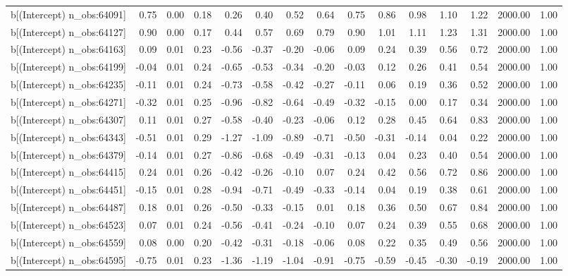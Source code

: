 \begin{table}[ht]
\begin{tabular}{rrrrrrrrrrrrrrr}
  b[(Intercept) n\_obs:64091] & 0.75 & 0.00 & 0.18 & 0.26 & 0.40 & 0.52 & 0.64 & 0.75 & 0.86 & 0.98 & 1.10 & 1.22 & 2000.00 & 1.00 \\ 
  b[(Intercept) n\_obs:64127] & 0.90 & 0.00 & 0.17 & 0.44 & 0.57 & 0.69 & 0.79 & 0.90 & 1.01 & 1.11 & 1.23 & 1.31 & 2000.00 & 1.00 \\ 
  b[(Intercept) n\_obs:64163] & 0.09 & 0.01 & 0.23 & -0.56 & -0.37 & -0.20 & -0.06 & 0.09 & 0.24 & 0.39 & 0.56 & 0.72 & 2000.00 & 1.00 \\ 
  b[(Intercept) n\_obs:64199] & -0.04 & 0.01 & 0.24 & -0.65 & -0.53 & -0.34 & -0.20 & -0.03 & 0.12 & 0.26 & 0.41 & 0.54 & 2000.00 & 1.00 \\ 
  b[(Intercept) n\_obs:64235] & -0.11 & 0.01 & 0.24 & -0.73 & -0.58 & -0.42 & -0.27 & -0.11 & 0.06 & 0.19 & 0.36 & 0.52 & 2000.00 & 1.00 \\ 
  b[(Intercept) n\_obs:64271] & -0.32 & 0.01 & 0.25 & -0.96 & -0.82 & -0.64 & -0.49 & -0.32 & -0.15 & 0.00 & 0.17 & 0.34 & 2000.00 & 1.00 \\ 
  b[(Intercept) n\_obs:64307] & 0.11 & 0.01 & 0.27 & -0.58 & -0.40 & -0.23 & -0.06 & 0.12 & 0.28 & 0.45 & 0.64 & 0.83 & 2000.00 & 1.00 \\ 
  b[(Intercept) n\_obs:64343] & -0.51 & 0.01 & 0.29 & -1.27 & -1.09 & -0.89 & -0.71 & -0.50 & -0.31 & -0.14 & 0.04 & 0.22 & 2000.00 & 1.00 \\ 
  b[(Intercept) n\_obs:64379] & -0.14 & 0.01 & 0.27 & -0.86 & -0.68 & -0.49 & -0.31 & -0.13 & 0.04 & 0.23 & 0.40 & 0.54 & 2000.00 & 1.00 \\ 
  b[(Intercept) n\_obs:64415] & 0.24 & 0.01 & 0.26 & -0.42 & -0.26 & -0.10 & 0.07 & 0.24 & 0.42 & 0.56 & 0.72 & 0.86 & 2000.00 & 1.00 \\ 
  b[(Intercept) n\_obs:64451] & -0.15 & 0.01 & 0.28 & -0.94 & -0.71 & -0.49 & -0.33 & -0.14 & 0.04 & 0.19 & 0.38 & 0.61 & 2000.00 & 1.00 \\ 
  b[(Intercept) n\_obs:64487] & 0.18 & 0.01 & 0.26 & -0.50 & -0.33 & -0.15 & 0.01 & 0.18 & 0.36 & 0.50 & 0.67 & 0.84 & 2000.00 & 1.00 \\ 
  b[(Intercept) n\_obs:64523] & 0.07 & 0.01 & 0.24 & -0.56 & -0.41 & -0.24 & -0.10 & 0.07 & 0.24 & 0.39 & 0.55 & 0.68 & 2000.00 & 1.00 \\ 
  b[(Intercept) n\_obs:64559] & 0.08 & 0.00 & 0.20 & -0.42 & -0.31 & -0.18 & -0.06 & 0.08 & 0.22 & 0.35 & 0.49 & 0.56 & 2000.00 & 1.00 \\ 
  b[(Intercept) n\_obs:64595] & -0.75 & 0.01 & 0.23 & -1.36 & -1.19 & -1.04 & -0.91 & -0.75 & -0.59 & -0.45 & -0.30 & -0.19 & 2000.00 & 1.00 \\ 

\end{tabular}
\end{table}
